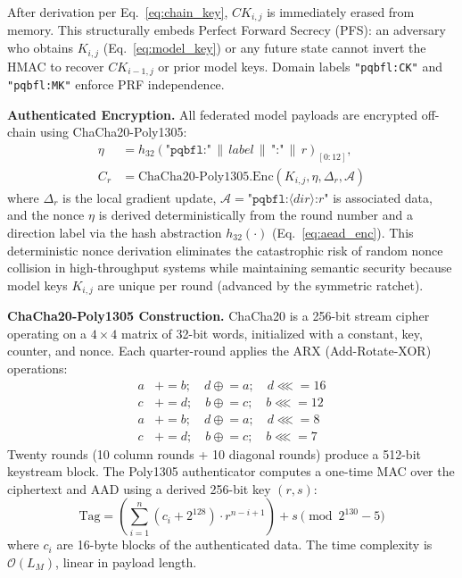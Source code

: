 \documentclass[journal, 10pt, twocolumn]{IEEEtran}
\begin{document}
After derivation per Eq.~\eqref{eq:chain_key}, $CK_{i,j}$ is immediately erased from memory. This structurally embeds Perfect Forward Secrecy (PFS): an adversary who obtains $K_{i,j}$ (Eq.~\eqref{eq:model_key}) or any future state cannot invert the HMAC to recover $CK_{i-1,j}$ or prior model keys. Domain labels \texttt{"pqbfl:CK"} and \texttt{"pqbfl:MK"} enforce PRF independence.

\textbf{Authenticated Encryption.} All federated model payloads are encrypted off-chain using ChaCha20-Poly1305:
\begin{equation}
\begin{split}
\eta &= h_{32}(\texttt{"pqbfl:"} \,\|\, \textit{label} \,\|\, \texttt{":"} \,\|\, r)_{[0:12]}, \\
C_r &= \text{ChaCha20-Poly1305.Enc}(K_{i,j}, \eta, \Delta_r, \mathcal{A})
\end{split}
\label{eq:aead_enc}
\end{equation}
where $\Delta_r$ is the local gradient update, $\mathcal{A} = \texttt{"pqbfl:}\langle\textit{dir}\rangle\texttt{:}r\texttt{"}$ is associated data, and the nonce $\eta$ is derived deterministically from the round number and a direction label via the hash abstraction $h_{32}(\cdot)$ (Eq.~\eqref{eq:aead_enc}). This deterministic nonce derivation eliminates the catastrophic risk of random nonce collision in high-throughput systems while maintaining semantic security because model keys $K_{i,j}$ are unique per round (advanced by the symmetric ratchet).

\textbf{ChaCha20-Poly1305 Construction.} ChaCha20 is a 256-bit stream cipher operating on a $4 \times 4$ matrix of 32-bit words, initialized with a constant, key, counter, and nonce. Each quarter-round applies the ARX (Add-Rotate-XOR) operations:
\begin{equation}
\begin{split}
a &\mathrel{+}= b; \quad d \mathrel{\oplus}= a; \quad d \mathrel{\lll}= 16 \\
c &\mathrel{+}= d; \quad b \mathrel{\oplus}= c; \quad b \mathrel{\lll}= 12 \\
a &\mathrel{+}= b; \quad d \mathrel{\oplus}= a; \quad d \mathrel{\lll}= 8 \\
c &\mathrel{+}= d; \quad b \mathrel{\oplus}= c; \quad b \mathrel{\lll}= 7
\end{split}
\label{eq:chacha_qr}
\end{equation}
Twenty rounds (10 column rounds + 10 diagonal rounds) produce a 512-bit keystream block. The Poly1305 authenticator computes a one-time MAC over the ciphertext and AAD using a derived 256-bit key $(r, s)$:
\begin{equation}
\text{Tag} = \left(\sum_{i=1}^{n} (c_i + 2^{128}) \cdot r^{n-i+1}\right) + s \pmod{2^{130}-5}
\label{eq:poly1305_tag}
\end{equation}
where $c_i$ are 16-byte blocks of the authenticated data. The time complexity is $\mathcal{O}(L_M)$, linear in payload length.
\end{document}
